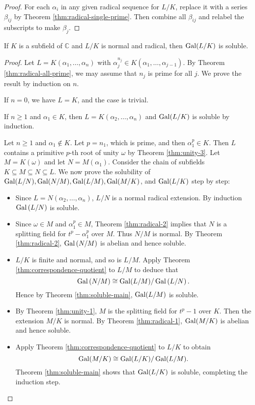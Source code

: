 \begin{proof}
    For each $\alpha_i$ in any given radical sequence for $L / K$, replace it with a series $\beta_{ij}$ by Theorem \ref{thm:radical-single-prime}. Then combine all $\beta_{ij}$ and relabel the subscripts to make $\beta_{j}$. 
\end{proof}

\begin{theorem} \label{thm:radical-3}
If $K$ is a subfield of $\mathbb{C}$ and $L / K$ is normal and radical, then $\operatorname{Gal}(L / K)$ is soluble.
\end{theorem}

\begin{proof}
Let $L=K\left(\alpha_1, \ldots, \alpha_n\right)$ with $\alpha_j^{n_j} \in K\left(\alpha_1, \ldots, \alpha_{j-1}\right)$. By Theorem \ref{thm:radical-all-prime}, we may assume that $n_j$ is prime for all $j$. We prove the result by induction on $n$. 

If $n = 0$, we have $L = K$, and the case is trivial.

If $n \ge 1$ and $\alpha_1 \in K$, then $L=K\left(\alpha_2, \ldots, \alpha_n\right)$ and $\operatorname{Gal}(L / K)$ is soluble by induction.

Let $n \ge 1$ and $\alpha_1 \notin K$. Let $p = n_1$, which is prime, and then $\alpha_1^p \in K$.  Then $L$ contains a primitive $p$-th root of unity $\omega$ by Theorem \ref{thm:unity-3}. Let $M = K(\omega)$ and let $N = M(\alpha_1)$. Consider the chain of subfields $K \subseteq M \subseteq N \subseteq L$. We now prove the solubility of $\operatorname{Gal}(L/N), \operatorname{Gal}(N/M), \operatorname{Gal}(L/M), \operatorname{Gal}(M/K)$, and $\operatorname{Gal}(L/K)$ step by step:

\begin{itemize}
    \item Since $L=N\left(\alpha_2, \ldots, \alpha_n\right)$, $L / N$ is a normal radical extension. By induction $\operatorname{Gal}\left(L / N\right)$ is soluble. 
    \item Since $ \omega \in M$ and $\alpha_1^p \in M$, Theorem \ref{thm:radical-2} implies that $N$ is a splitting field for $t^p-\alpha_1^p$ over $M$. Thus $N / M$ is normal. By Theorem \ref{thm:radical-2}, $\operatorname{Gal}\left(N / M\right)$ is abelian and hence soluble. 
    \item  $L/ K$ is finite and normal, and so is $L / M$. Apply Theorem \ref{thm:correspondence-quotient} to $L / M$ to deduce that
    $$
    \operatorname{Gal}\left( N / M \right) \cong \operatorname{Gal}(L / M) / \operatorname{Gal}\left(L / N\right).
    $$
    Hence by Theorem \ref{thm:soluble-main},  $ \operatorname{Gal}(L / M)$ is soluble.
    \item By Theorem \ref{thm:unity-1}, $M$ is the splitting field for $t^p-1$ over $K$. Then the extension $M / K$ is normal. By Theorem \ref{thm:radical-1}, $\operatorname{Gal}(M / K)$ is abelian and hence soluble.
    \item  Apply Theorem \ref{thm:correspondence-quotient} to $L / K$ to obtain
    $$
    \operatorname{Gal}(M / K) \cong \operatorname{Gal}(L / K) / \operatorname{Gal}(L / M). 
    $$
    Theorem \ref{thm:soluble-main} shows that $\operatorname{Gal}(L / K)$ is soluble, completing the induction step.
\end{itemize}
\end{proof}



